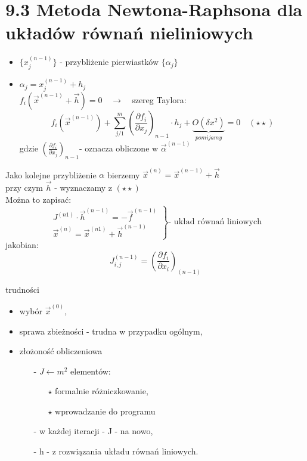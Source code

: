 \section{9.3 Metoda Newtona-Raphsona dla układów równań nieliniowych}

\begin{frame}{}
  \begin{itemize}
    \item $\{x_j^{(n-1)}\}$ - przybliżenie pierwiastków $\{\alpha_j\}$
    \item $\alpha_j=x_j^{(n-1)}+h_j$\\
    $f_i(\overrightarrow{x}^{(n-1)}+\overrightarrow{h})=0\quad\rightarrow\quad$szereg Taylora:
    $$f_i(\overrightarrow{x}^{(n-1)})+\sum_{j/1}^{m}(\frac{\partial f_i}{\partial x_j})_{n-1} \cdot h_j+\underbrace{O(\delta x^2)}_{pomijamy}=0\quad(\star\star)$$
    gdzie $(\frac{\partial f_i}{\partial x_j})_{n-1}$- oznacza obliczone w $\overrightarrow{\alpha}^{(n-1)}$
  \end{itemize}
\end{frame}

\begin{frame}{}
  Jako kolejne przybliżenie $\alpha$ bierzemy $\overrightarrow{x}^{(n)}=\overrightarrow{x}^{(n-1)}+\overrightarrow{h}$\\
  przy czym $\overrightarrow{h}$ - wyznaczamy z $(\star\star)$\\
  Można to zapisać:
 $$
 \left.
 \begin{array}{lr}
 J^{(n1)} \cdot \overrightarrow{h}^{(n-1)} = -\overrightarrow{f}^{(n-1)}\\
 \overrightarrow{x}^{(n)} = \overrightarrow{x}^{(n1)}+\overrightarrow{h}^{(n-1)}
 \end{array}\right\}
 \text{- układ równań liniowych}
 $$
  jakobian:
  $$J^{(n-1)}_{i,j}=(\frac{\partial f_i}{\partial x_i})_{(n-1)}$$
\end{frame}

\begin{frame}{}
  \begin{block}{trudności}
    \begin{itemize}
      \item wybór $\overrightarrow{x}^{(0)}$,
      \item sprawa zbieżności - trudna w przypadku ogólnym,
      \item złożoność obliczeniowa
      \begin{itemize}
        \item[-] $J\leftarrow m^2$ elementów:
        \begin{itemize}
          \item[$\star$] formalnie różniczkowanie,
          \item[$\star$] wprowadzanie do programu
        \end{itemize}
        \item[-] w każdej iteracji - J - na nowo,
        \item[-] h - z rozwiązania układu równań liniowych.
      \end{itemize}
    \end{itemize}
  \end{block}
\end{frame}

